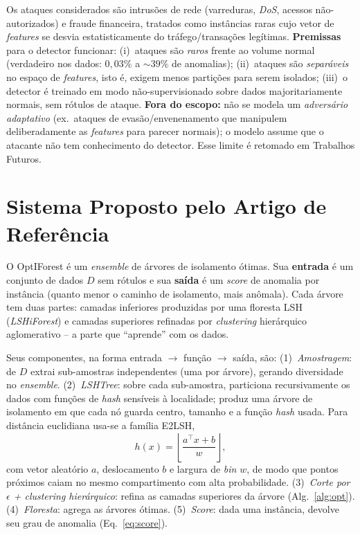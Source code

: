 \documentclass[conference]{IEEEtran}
\begin{document}
Os ataques considerados s\~ao intrus\~oes de rede (varreduras, \emph{DoS}, acessos
n\~ao-autorizados) e fraude financeira, tratados como inst\^ancias raras cujo vetor de
\emph{features} se desvia estatisticamente do tr\'afego/transa\c{c}\~oes leg\'itimas.
\textbf{Premissas} para o detector funcionar: (i)~ataques s\~ao \emph{raros} frente ao
volume normal (verdadeiro nos dados: $0{,}03\%$ a $\sim 39\%$ de anomalias);
(ii)~ataques s\~ao \emph{separ\'aveis} no espa\c{c}o de \emph{features}, isto \'e, exigem
menos parti\c{c}\~oes para serem isolados; (iii)~o detector \'e treinado em modo
n\~ao-supervisionado sobre dados majoritariamente normais, sem r\'otulos de ataque.
\textbf{Fora do escopo:} n\~ao se modela um \emph{advers\'ario adaptativo} (ex.\
ataques de evas\~ao/envenenamento que manipulem deliberadamente as \emph{features}
para parecer normais); o modelo assume que o atacante n\~ao tem conhecimento do
detector. Esse limite \'e retomado em Trabalhos Futuros.

\section{Sistema Proposto pelo Artigo de Refer\^encia}

O OptIForest \'e um \emph{ensemble} de \'arvores de
isolamento \'otimas. Sua \textbf{entrada} \'e um conjunto de dados $D$ sem r\'otulos
e sua \textbf{sa\'ida} \'e um \emph{score} de anomalia por inst\^ancia (quanto menor o
caminho de isolamento, mais an\^omala). Cada \'arvore tem duas partes: camadas
inferiores produzidas por uma floresta LSH (\emph{LSHiForest}) e camadas superiores
refinadas por \emph{clustering} hier\'arquico aglomerativo -- a parte que ``aprende''
com os dados.

Seus componentes, na forma entrada $\rightarrow$ fun\c{c}\~ao $\rightarrow$ sa\'ida, s\~ao:
(1)~\emph{Amostragem}: de $D$ extrai sub-amostras independentes (uma por \'arvore),
gerando diversidade no \emph{ensemble}. (2)~\emph{LSHTree}: sobre cada sub-amostra,
particiona recursivamente os dados com fun\c{c}\~oes de \emph{hash} sens\'iveis \`a
localidade; produz uma \'arvore de isolamento em que cada n\'o guarda centro,
tamanho e a fun\c{c}\~ao \emph{hash} usada. Para dist\^ancia euclidiana usa-se a fam\'ilia
E2LSH,
\begin{equation}
  h(x) = \left\lfloor \frac{a^{\top}x + b}{w} \right\rfloor,
  \label{eq:e2lsh}
\end{equation}
com vetor aleat\'orio $a$, deslocamento $b$ e largura de \emph{bin} $w$, de modo que
pontos pr\'oximos caiam no mesmo compartimento com alta probabilidade.
(3)~\emph{Corte por $\epsilon$ + clustering hier\'arquico}: refina as camadas
superiores da \'arvore (Alg.~\ref{alg:opt}). (4)~\emph{Floresta}: agrega as
\'arvores \'otimas. (5)~\emph{Score}: dada uma inst\^ancia, devolve seu grau de
anomalia (Eq.~\ref{eq:score}).
\end{document}
